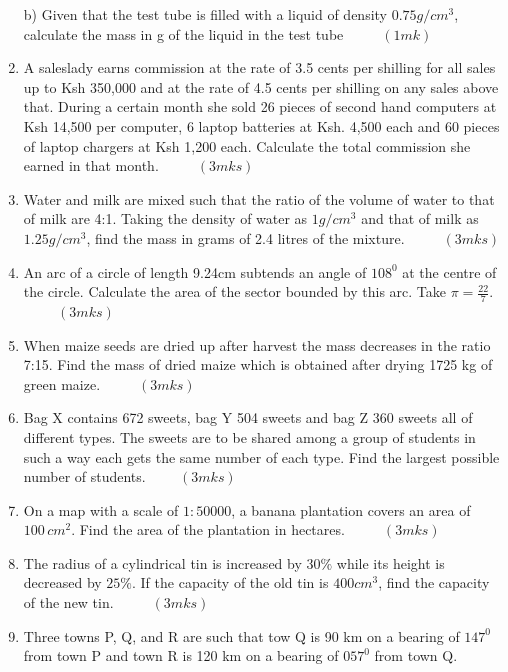 \documentclass[
  a4paperpaper,
]{scrbook}
\begin{document}
\begin{tcolorbox}
\begin{enumerate}
  b) Given that the test tube is filled with a liquid of density
  \(0.75 g/cm^3\), calculate the mass in g of the liquid in the test
  tube \(\hspace{1cm}(1mk)\)
\item
  A saleslady earns commission at the rate of 3.5 cents per shilling for
  all sales up to Ksh 350,000 and at the rate of 4.5 cents per shilling
  on any sales above that. During a certain month she sold 26 pieces of
  second hand computers at Ksh 14,500 per computer, 6 laptop batteries
  at Ksh. 4,500 each and 60 pieces of laptop chargers at Ksh 1,200 each.
  Calculate the total commission she earned in that month.
  \(\hspace{1cm}(3mks)\)
\item
  Water and milk are mixed such that the ratio of the volume of water to
  that of milk are 4:1. Taking the density of water as \(1g/cm^3\) and
  that of milk as \(1.25g/cm^3\), find the mass in grams of 2.4 litres
  of the mixture. \(\hspace{1cm}(3mks)\)
\item
  An arc of a circle of length 9.24cm subtends an angle of \(108^0\) at
  the centre of the circle. Calculate the area of the sector bounded by
  this arc. Take \(\pi=\frac{22}{7}\). \(\hspace{1cm} (3mks)\)
\item
  When maize seeds are dried up after harvest the mass decreases in the
  ratio 7:15. Find the mass of dried maize which is obtained after
  drying 1725 kg of green maize. \(\hspace{1cm}(3mks)\)
\item
  Bag X contains 672 sweets, bag Y 504 sweets and bag Z 360 sweets all
  of different types. The sweets are to be shared among a group of
  students in such a way each gets the same number of each type. Find
  the largest possible number of students.\(\hspace{1cm} (3mks)\)
\item
  On a map with a scale of \(1:50000\), a banana plantation covers an
  area of \(100\,cm^2\). Find the area of the plantation in hectares.
  \(\hspace{1cm} (3mks)\)
\item
  The radius of a cylindrical tin is increased by \(30\%\) while its
  height is decreased by \(25\%\). If the capacity of the old tin is
  \(400 cm^3\), find the capacity of the new tin. \(\hspace{1cm}(3mks)\)
\item
  Three towns P, Q, and R are such that tow Q is 90 km on a bearing of
  \(147^0\) from town P and town R is 120 km on a bearing of \(057^0\)
  from town Q.


\end{enumerate}
\end{tcolorbox}
\end{document}
